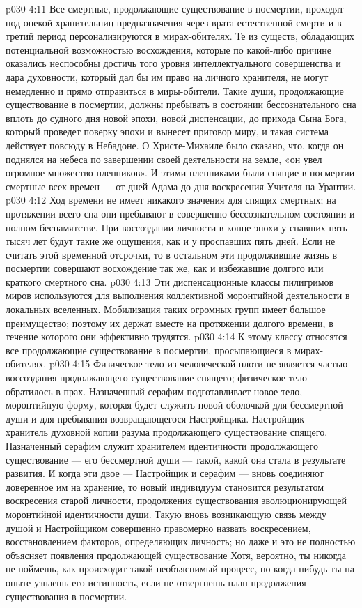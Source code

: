 \vs p030 4:11 \bibnobreakspace {} Все смертные, продолжающие существование в посмертии, проходят под опекой хранительниц предназначения через врата естественной смерти и в третий период персонализируются в мирах\hyp{}обителях. Те из существ, обладающих потенциальной возможностью восхождения, которые по какой\hyp{}либо причине оказались неспособны достичь того уровня интеллектуального совершенства и дара духовности, который дал бы им право на личного хранителя, не могут немедленно и прямо отправиться в миры\hyp{}обители. Такие души, продолжающие существование в посмертии, должны пребывать в состоянии бессознательного сна вплоть до судного дня новой эпохи, новой диспенсации, до прихода Сына Бога, который проведет поверку эпохи и вынесет приговор миру, и такая система действует повсюду в Небадоне. О Христе\hyp{}Михаиле было сказано, что, когда он поднялся на небеса по завершении своей деятельности на земле, «он увел огромное множество пленников». И этими пленниками были спящие в посмертии смертные всех времен --- от дней Адама до дня воскресения Учителя на Урантии.
\vs p030 4:12 Ход времени не имеет никакого значения для спящих смертных; на протяжении всего сна они пребывают в совершенно бессознательном состоянии и полном беспамятстве. При воссоздании личности в конце эпохи у спавших пять тысяч лет будут такие же ощущения, как и у проспавших пять дней. Если не считать этой временной отсрочки, то в остальном эти продолжившие жизнь в посмертии совершают восхождение так же, как и избежавшие долгого или краткого смертного сна.
\vs p030 4:13 Эти диспенсационные классы пилигримов миров используются для выполнения коллективной моронтийной деятельности в локальных вселенных. Мобилизация таких огромных групп имеет большое преимущество; поэтому их держат вместе на протяжении долгого времени, в течение которого они эффективно трудятся.
\vs p030 4:14 \bibnobreakspace {} К этому классу относятся все продолжающие существование в посмертии, просыпающиеся в мирах\hyp{}обителях.
\vs p030 4:15 Физическое тело из человеческой плоти не является частью воссоздания продолжающего существование спящего; физическое тело обратилось в прах. Назначенный серафим подготавливает новое тело, моронтийную форму, которая будет служить новой оболочкой для бессмертной души и для пребывания возвращающегося Настройщика. Настройщик --- хранитель духовной копии разума продолжающего существование спящего. Назначенный серафим служит хранителем идентичности продолжающего существование --- его бессмертной души --- такой, какой она стала в результате развития. И когда эти двое --- Настройщик и серафим --- вновь соединяют доверенное им на хранение, то новый индивидуум становится результатом воскресения старой личности, продолжения существования эволюционирующей моронтийной идентичности души. Такую вновь возникающую связь между душой и Настройщиком совершенно правомерно назвать воскресением, восстановлением факторов, определяющих личность; но даже и это не полностью объясняет появления продолжающей существование  Хотя, вероятно, ты никогда не поймешь, как происходит такой необъяснимый процесс, но когда\hyp{}нибудь ты на опыте узнаешь его истинность, если не отвергнешь план продолжения существования в посмертии.
